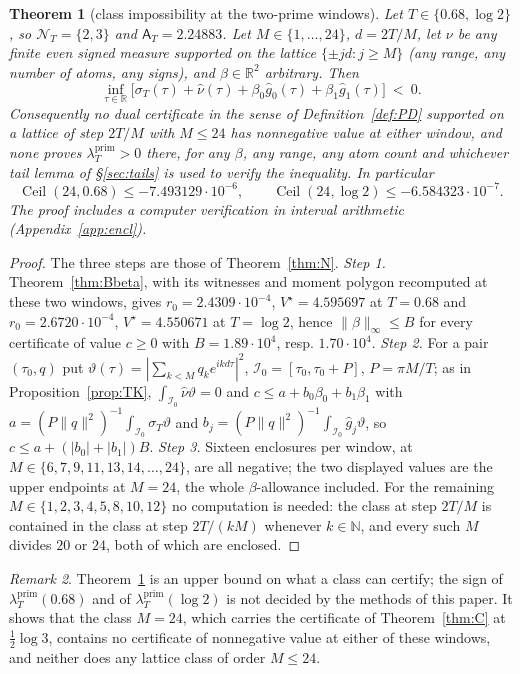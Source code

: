 \documentclass[11pt]{amsart}
\newtheorem{theorem}{Theorem}[section]
\theoremstyle{definition}
\theoremstyle{remark}
\newtheorem{remark}[theorem]{Remark}
\newcommand{\R}{\mathbb R}
\newcommand{\N}{\mathbb N}
\newcommand{\lamP}{\lambda^{\mathrm{prim}}_T}
\newcommand{\sT}{\sigma_T}
\newcommand{\gh}[1]{\widehat g_{#1}}
\newcommand{\nuh}{\widehat\nu}
\newcommand{\NT}{\mathcal N_T}
\newcommand{\Aconst}{\mathsf A_T}
\begin{document}
\begin{theorem}[class impossibility at the two-prime windows]\label{thm:Np}
Let $T\in\{0.68,\log2\}$, so $\NT=\{2,3\}$ and
$\Aconst=2.24883$. Let $M\in\{1,\dots,24\}$, $d=2T/M$, let $\nu$ be any finite even signed measure
supported on the lattice $\{\pm jd:j\ge M\}$ (any range, any number of atoms, any signs), and
$\beta\in\R^2$ arbitrary. Then
\[
\inf_{\tau\in\R}\big[\sT(\tau)+\nuh(\tau)+\beta_0\gh0(\tau)+\beta_1\gh1(\tau)\big]\ <\ 0 .
\]
Consequently no dual certificate in the sense of Definition~\ref{def:PD} supported on a lattice of
step $2T/M$ with $M\le24$ has nonnegative value at either window, and none proves $\lamP>0$ there,
for any $\beta$, any range, any atom count and whichever tail lemma of \S\ref{sec:tails} is used to
verify the inequality. In particular
\[
\operatorname{Ceil}(24,0.68)\le-7.493129\cdot10^{-6},\qquad
\operatorname{Ceil}(24,\log2)\le-6.584323\cdot10^{-7}.
\]
The proof includes a computer verification in interval arithmetic (Appendix~\ref{app:encl}).
\end{theorem}
\begin{proof}
The three steps are those of Theorem~\ref{thm:N}. \emph{Step 1.} Theorem~\ref{thm:Bbeta}, with its
witnesses and moment polygon recomputed at these two windows, gives $r_0=2.4309\cdot10^{-4}$,
$V^\star=4.595697$ at $T=0.68$ and $r_0=2.6720\cdot10^{-4}$, $V^\star=4.550671$ at $T=\log2$, hence
$\|\beta\|_\infty\le B$ for every certificate of value $c\ge0$ with $B=1.89\cdot10^4$, resp.
$1.70\cdot10^4$. \emph{Step 2.} For a pair $(\tau_0,q)$ put $\vartheta(\tau)=|\sum_{k<M}q_ke^{ikd\tau}|^2$,
$\mathcal I_0=[\tau_0,\tau_0+P]$, $P=\pi M/T$; as in Proposition~\ref{prop:TK}, $\int_{\mathcal I_0}\nuh\vartheta=0$ and
$c\le a+b_0\beta_0+b_1\beta_1$ with $a=(P\|q\|^2)^{-1}\int_{\mathcal I_0}\sT\vartheta$ and
$b_j=(P\|q\|^2)^{-1}\int_{\mathcal I_0}\gh j\vartheta$, so $c\le a+(|b_0|+|b_1|)B$. \emph{Step 3.} Sixteen enclosures
per window, at $M\in\{6,7,9,11,13,14,\dots,24\}$, are all negative; the two displayed values are the
upper endpoints at $M=24$, the whole $\beta$-allowance included. For the remaining
$M\in\{1,2,3,4,5,8,10,12\}$ no computation is needed: the class at step $2T/M$ is contained in the
class at step $2T/(kM)$ whenever $k\in\N$, and every such $M$ divides $20$ or $24$, both of which are
enclosed.
\end{proof}

\begin{remark}
Theorem~\ref{thm:Np} is an upper bound on what a class can certify; the sign of $\lamP(0.68)$ and of
$\lamP(\log2)$ is not decided by the methods of this paper. It shows that the class $M=24$, which
carries the certificate of Theorem~\ref{thm:C} at $\frac12\log3$, contains no certificate of
nonnegative value at either of these windows, and neither does any lattice class of order $M\le24$.
\end{remark}
\end{document}
